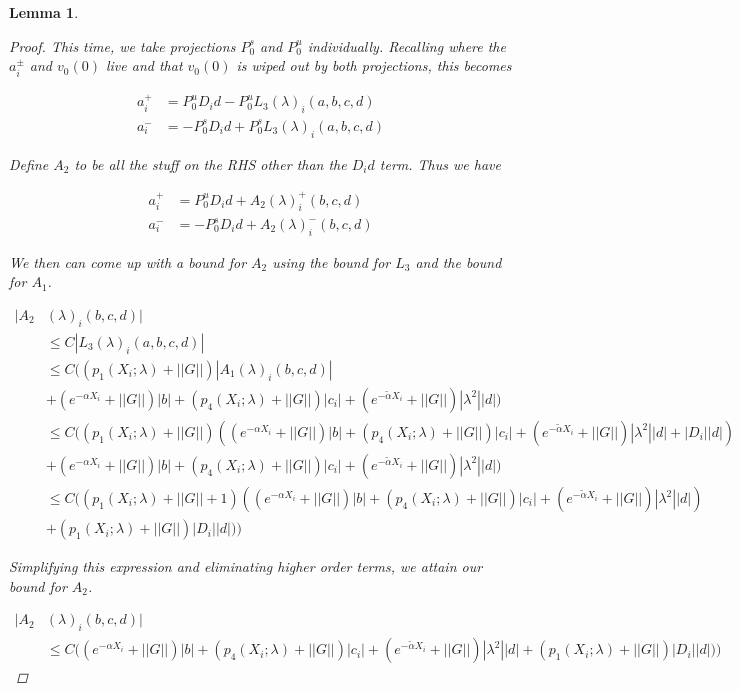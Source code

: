\documentclass[12pt]{article}
\newtheorem{lemma}{Lemma}
\begin{document}
\begin{lemma}
\begin{proof}
This time, we take projections $P^s_0$ and $P^u_0$ individually. Recalling where the $a_i^\pm$ and $v_0(0)$ live and that $v_0(0)$ is wiped out by both projections, this becomes 

\begin{align*}
a_i^+ &= P^u_0 D_i d - P^u_0 L_3(\lambda)_i(a, b, c, d) \\
a_i^- &= -P^s_0 D_i d + P^s_0 L_3(\lambda)_i(a, b, c, d)
\end{align*}

Define $A_2$ to be all the stuff on the RHS other than the $D_i d$ term. Thus we have 

\begin{align*}
a_i^+ &= P^u_0 D_i d + A_2(\lambda)_i^+(b, c, d) \\
a_i^- &= -P^s_0 D_i d + A_2(\lambda)_i^-(b, c, d)
\end{align*}

We then can come up with a bound for $A_2$ using the bound for $L_3$ and the bound for $A_1$.

\begin{align*}
|A_2&(\lambda)_i(b, c, d)| \\
&\leq C |L_3(\lambda)_i(a, b, c, d)| \\
&\leq C \Big( (p_1(X_i; \lambda) + ||G|| )|A_1(\lambda)_i(b, c, d)| \\
&+ (e^{-\alpha X_i} + ||G||)|b| + ( p_4(X_i; \lambda) + ||G|| )|c_i| + (e^{-\tilde{\alpha} X_i} + ||G||) |\lambda^2| |d| \Big) \\
&\leq C \Big( (p_1(X_i; \lambda) + ||G|| )( (e^{-\alpha X_i} + ||G||)|b| + ( p_4(X_i; \lambda) + ||G|| )|c_i| + (e^{-\tilde{\alpha} X_i} + ||G||) |\lambda^2| |d| + |D_i||d|)  \\
&+ (e^{-\alpha X_i} + ||G||)|b| + ( p_4(X_i; \lambda) + ||G|| )|c_i| + (e^{-\tilde{\alpha} X_i} + ||G||) |\lambda^2| |d| \Big) \\
&\leq C \Big( (p_1(X_i; \lambda) + ||G|| + 1)((e^{-\alpha X_i} + ||G||)|b| 
+ ( p_4(X_i; \lambda) + ||G|| )|c_i| + (e^{-\tilde{\alpha} X_i} + ||G||) |\lambda^2| |d|)\\
&+(p_1(X_i; \lambda) + ||G|| )|D_i||d|) \Big)
\end{align*}

Simplifying this expression and eliminating higher order terms, we attain our bound for $A_2$.

\begin{align*}
|A_2&(\lambda)_i(b, c, d)| \\
&\leq C \Big( (e^{-\alpha X_i} + ||G||)|b| + ( p_4(X_i; \lambda) + ||G|| )|c_i| + (e^{-\tilde{\alpha} X_i} + ||G||) |\lambda^2| |d| +(p_1(X_i; \lambda) + ||G|| )|D_i||d|) \Big)
\end{align*}

\end{proof}
\end{lemma}
\end{document}
